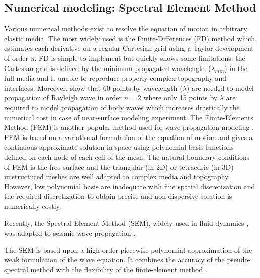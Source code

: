 \documentclass[manuscript,revised]{geophysics}
\begin{document}
\subsection{Numerical modeling: Spectral Element Method}

\noindent Various numerical methods exist to resolve the equation of motion in arbitrary elastic media. The most widely used is the Finite-Differences (FD) method \citep{Virieux_PSV_1986,Levander_PSV_1988,Robertsson_FDM_1994,Pratt_EWM_1990,Stekl_VEM_1998,Saenger_FDM_2004} which estimates each derivative on a regular Cartesian grid using a Taylor development \citep{Moczo_FDM_2004} of order \textit{n}. FD is simple to implement but quickly shows some limitations: the Cartesian grid is defined by the minimum propagated wavelength ($\lambda_{min}$) in the full media and is unable to reproduce properly complex topography and interfaces. Moreover, \citet{Saenger_FDM_2000} show that 60 points by wavelength ($\lambda$) are needed to model propagation of Rayleigh wave in order $n=2$ where only 15 points by $\lambda$ are required to model propagation of body waves which increases drastically the numerical cost in case of near-surface modeling experiment. The Finite-Elements Method (FEM) is another popular method used for wave propagation modeling \citep{Lysmer_FEM_1972,Seron_FEM_1990,Hulbert_FEM_1990}. FEM is based on a variational formulation of the equation of motion and gives a continuous approximate solution in space using polynomial basis functions defined on each node of each cell of the mesh. The natural boundary conditions of FEM is the free surface and the triangular (in 2D) or tetraedric (in 3D) unstructured meshes are well adapted to complex media and topography. However, low polynomial basis are inadequate with fine spatial discretization and the required discretization to obtain precise and non-dispersive solution is numerically costly. 

\noindent Recently, the Spectral Element Method (SEM), widely used in fluid dynamics \citep{Patera_SEM_1984,Korczak_SEM_1986,Karniadakis_FEM_1989}, was adapted to seismic wave propagation \citep{Komatitsch_SEM_1998,Komatitsch_ISM_1999,Komatitsch_SEM_2005,Festa_PML_2005}. 

\noindent The SEM is based upon a high-order piecewise polynomial approximation of the weak formulation of the wave equation. It combines the accuracy of the pseudo-spectral method with the flexibility of the finite-element method \citep{Tromp_SEM_2008}. 
\end{document}
